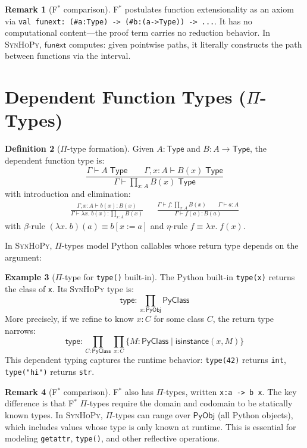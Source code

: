 \documentclass[11pt,a4paper]{report}
\theoremstyle{definition}
\newtheorem{definition}{Definition}[chapter]
\newtheorem{example}[definition]{Example}
\newtheorem{remark}[definition]{Remark}
\theoremstyle{plain}
\newcommand{\Type}{\mathsf{Type}}
\newcommand{\PyObj}{\mathsf{PyObj}}
\newcommand{\PyClass}{\mathsf{PyClass}}
\newcommand{\fstar}{F$^{*}$}
\newcommand{\synhopy}{\textsc{SynHoPy}}
\begin{document}
\begin{remark}[\fstar{} comparison]
\fstar{} postulates function extensionality as an axiom via
\lstinline[style=fstar]|val funext: (#a:Type) -> (#b:(a->Type)) -> ...|.
It has no computational content---the proof term carries no
reduction behavior.  In \synhopy{}, $\mathsf{funext}$ computes: given pointwise
paths, it literally constructs the path between functions via the interval.
\end{remark}


\section{Dependent Function Types ($\Pi$-Types)}

\begin{definition}[$\Pi$-type formation]
Given $A : \Type$ and $B : A \to \Type$, the dependent function type is:
\[
  \frac{\Gamma \vdash A \;\Type \qquad \Gamma, x : A \vdash B(x) \;\Type}
       {\Gamma \vdash \prod_{x : A} B(x) \;\Type}
\]
with introduction and elimination:
\begin{align}
  \frac{\Gamma, x : A \vdash b(x) : B(x)}
       {\Gamma \vdash \lambda x.\; b(x) : \prod_{x : A} B(x)}
  &&
  \frac{\Gamma \vdash f : \prod_{x : A} B(x) \qquad \Gamma \vdash a : A}
       {\Gamma \vdash f(a) : B(a)}
\end{align}
with $\beta$-rule $(\lambda x.\;b)(a) \equiv b[x := a]$ and
$\eta$-rule $f \equiv \lambda x.\;f(x)$.
\end{definition}

In \synhopy{}, $\Pi$-types model Python callables whose return type depends on
the argument:

\begin{example}[$\Pi$-type for \texttt{type()} built-in]
The Python built-in \lstinline[style=python]{type(x)} returns the class of
\lstinline[style=python]{x}.  Its \synhopy{} type is:
\[
  \mathsf{type} : \prod_{x : \PyObj} \PyClass
\]
More precisely, if we refine to know $x : C$ for some class $C$, the return
type narrows:
\[
  \mathsf{type} : \prod_{C : \PyClass}\prod_{x : C} \{M : \PyClass \mid \mathsf{isinstance}(x, M)\}
\]
This dependent typing captures the runtime behavior: \lstinline[style=python]{type(42)}
returns \lstinline[style=python]{int}, \lstinline[style=python]{type("hi")}
returns \lstinline[style=python]{str}.
\end{example}

\begin{remark}[\fstar{} comparison]
\fstar{} also has $\Pi$-types, written \lstinline[style=fstar]|x:a -> b x|.
The key difference is that \fstar{} $\Pi$-types require the domain and codomain
to be statically known types.  In \synhopy{}, $\Pi$-types can range over
$\PyObj$ (all Python objects), which includes values whose type is only known
at runtime.  This is essential for modeling \lstinline[style=python]{getattr},
\lstinline[style=python]{type()}, and other reflective operations.
\end{remark}
\end{document}
